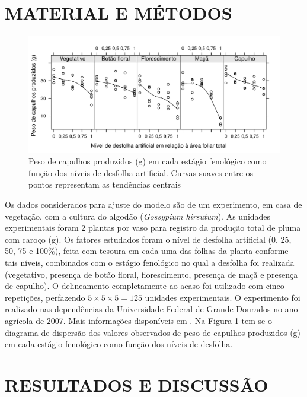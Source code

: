 \newpage
\section{MATERIAL E MÉTODOS}

\begin{figure}[!b]
\begin{center}
 \includegraphics[width=\textwidth]{../figuras/previsu.pdf} 
\end{center}
\caption{Peso de capulhos produzidos (g) em cada estágio fenológico
  como função dos níveis de desfolha artificial. Curvas suaves entre
  os pontos representam as tendências centrais}\label{previsu}
\end{figure} 

Os dados considerados para ajuste do modelo são de um experimento, em
casa de vegetação, com a cultura do algodão (\emph{Gossypium
  hirsutum}). As unidades experimentais foram 2 plantas por vaso para
registro da produção total de pluma com caroço (g).  Os fatores
estudados foram o nível de desfolha artificial (0, 25, 50, 75 e
100\%), feita com tesoura em cada uma das folhas da planta conforme
tais níveis, combinados com o estágio fenológico no qual a desfolha
foi realizada (vegetativo, presença de botão floral, florescimento,
presença de maçã e presença de capulho). O delineamento completamente
ao acaso foi utilizado com cinco repetições, perfazendo $5\times
5\times 5 = 125$ unidades experimentais.  O experimento foi realizado
nas dependências da Universidade Federal de Grande Dourados no ano
agrícola de 2007. Mais informações disponíveis em
.  Na Figura \ref{previsu} tem se o diagrama de
dispersão dos valores observados de peso de capulhos produzidos (g) em
cada estágio fenológico como função dos níveis de desfolha.

\newpage
\section{RESULTADOS E DISCUSSÃO}

